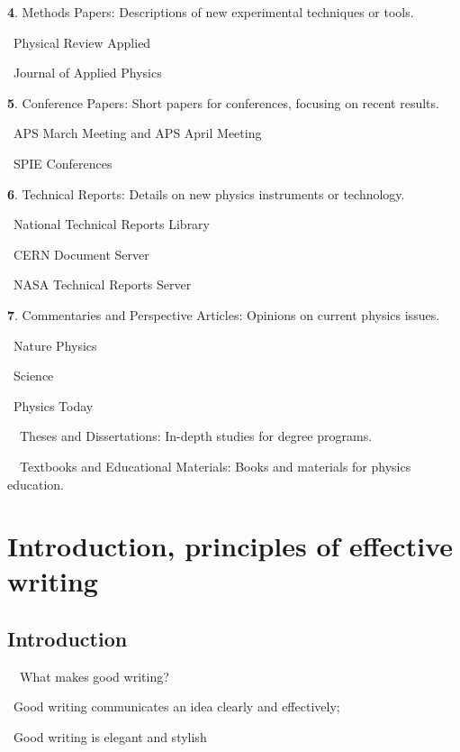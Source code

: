 \documentclass[a4paper, 12pt]{article}
\begin{document}
\vspace{4pt}\textbf{4}. Methods Papers: Descriptions of new experimental techniques or tools.
\par\quad\textopenbullet\ Physical Review Applied
\par\quad\textopenbullet\ Journal of Applied Physics

\vspace{4pt}\textbf{5}. Conference Papers: Short papers for conferences, focusing on recent results.
\par\quad\textopenbullet\ APS March Meeting and APS April Meeting
\par\quad\textopenbullet\ SPIE Conferences

\vspace{4pt}\textbf{6}. Technical Reports: Details on new physics instruments or technology.
\par\quad\textopenbullet\ National Technical Reports Library
\par\quad\textopenbullet\ CERN Document Server
\par\quad\textopenbullet\ NASA Technical Reports Server

\vspace{4pt}\textbf{7}. Commentaries and Perspective Articles: Opinions on current physics issues.
\par\quad\textopenbullet\ Nature Physics
\par\quad\textopenbullet\ Science
\par\quad\textopenbullet\ Physics Today

\par\ \textbullet\ Theses and Dissertations: In-depth studies for degree programs.
\par\ \textbullet\ Textbooks and Educational Materials: Books and materials for physics education.

\newpage\section{Introduction, principles of effective writing}

\subsection{Introduction}

\par\ \textbullet\ What makes good writing?
\par\quad\textopenbullet\ Good writing communicates an idea clearly and effectively;
\par\quad\textopenbullet\ Good writing is elegant and stylish
\end{document}
